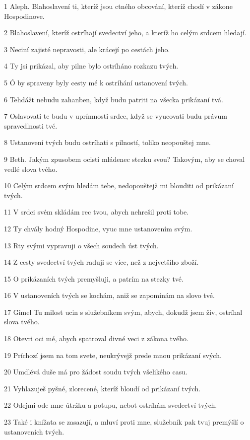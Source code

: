 \par 1 Aleph. Blahoslavení ti, kteríž jsou ctného obcování, kteríž chodí v zákone Hospodinove.
\par 2 Blahoslavení, kteríž ostríhají svedectví jeho, a kteríž ho celým srdcem hledají.
\par 3 Neciní zajisté nepravosti, ale krácejí po cestách jeho.
\par 4 Ty jsi prikázal, aby pilne bylo ostríháno rozkazu tvých.
\par 5 Ó by spraveny byly cesty mé k ostríhání ustanovení tvých.
\par 6 Tehdážt nebudu zahanben, když budu patriti na všecka prikázaní tvá.
\par 7 Oslavovati te budu v uprímnosti srdce, když se vyucovati budu právum spravedlnosti tvé.
\par 8 Ustanovení tvých budu ostríhati s pilností, toliko neopouštej mne.
\par 9 Beth. Jakým zpusobem ocistí mládenec stezku svou? Takovým, aby se choval vedlé slova tvého.
\par 10 Celým srdcem svým hledám tebe, nedopouštejž mi blouditi od prikázaní tvých.
\par 11 V srdci svém skládám rec tvou, abych nehrešil proti tobe.
\par 12 Ty chvály hodný Hospodine, vyuc mne ustanovením svým.
\par 13 Rty svými vypravuji o všech soudech úst tvých.
\par 14 Z cesty svedectví tvých raduji se více, než z nejvetšího zboží.
\par 15 O prikázaních tvých premyšluji, a patrím na stezky tvé.
\par 16 V ustanoveních tvých se kochám, aniž se zapomínám na slovo tvé.
\par 17 Gimel Tu milost ucin s služebníkem svým, abych, dokudž jsem živ, ostríhal slova tvého.
\par 18 Otevri oci mé, abych spatroval divné veci z zákona tvého.
\par 19 Príchozí jsem na tom svete, neukrývejž prede mnou prikázaní svých.
\par 20 Umdlévá duše má pro žádost soudu tvých všelikého casu.
\par 21 Vyhlazuješ pyšné, zlorecené, kteríž bloudí od prikázaní tvých.
\par 22 Odejmi ode mne útržku a potupu, nebot ostríhám svedectví tvých.
\par 23 Také i knížata se zasazují, a mluví proti mne, služebník pak tvuj premýšlí o ustanoveních tvých.
